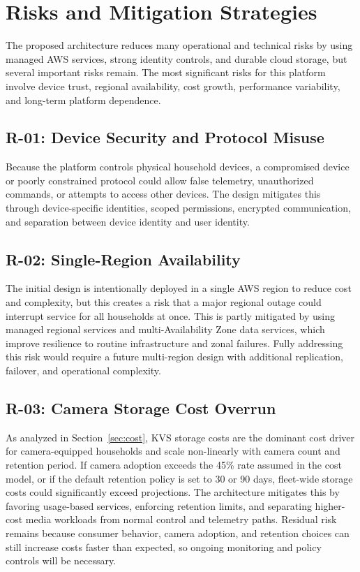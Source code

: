 \section{Risks and Mitigation Strategies}

The proposed architecture reduces many operational and technical risks by using managed AWS services, strong identity controls, and durable cloud storage, but several important risks remain. The most significant risks for this platform involve device trust, regional availability, cost growth, performance variability, and long-term platform dependence.

\subsection{R-01: Device Security and Protocol Misuse}

Because the platform controls physical household devices, a compromised device or poorly constrained protocol could allow false telemetry, unauthorized commands, or attempts to access other devices. The design mitigates this through device-specific identities, scoped permissions, encrypted communication, and separation between device identity and user identity.

\subsection{R-02: Single-Region Availability}

The initial design is intentionally deployed in a single AWS region to reduce cost and complexity, but this creates a risk that a major regional outage could interrupt service for all households at once. This is partly mitigated by using managed regional services and multi-Availability Zone data services, which improve resilience to routine infrastructure and zonal failures. Fully addressing this risk would require a future multi-region design with additional replication, failover, and operational complexity.

\subsection{R-03: Camera Storage Cost Overrun}

As analyzed in Section~\ref{sec:cost}, KVS storage costs are the dominant cost driver for camera-equipped households and scale non-linearly with camera count and retention period. If camera adoption exceeds the 45\% rate assumed in the cost model, or if the default retention policy is set to 30 or 90 days, fleet-wide storage costs could significantly exceed projections. The architecture mitigates this by favoring usage-based services, enforcing retention limits, and separating higher-cost media workloads from normal control and telemetry paths. Residual risk remains because consumer behavior, camera adoption, and retention choices can still increase costs faster than expected, so ongoing monitoring and policy controls will be necessary.

